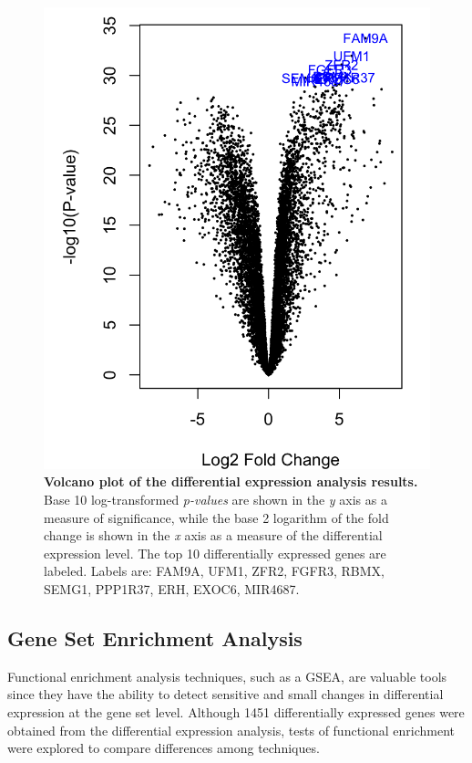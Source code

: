 \documentclass[9pt,twocolumn,twoside]{gsajnl}
\begin{document}
\begin{figure}[htbp]
\centering
\includegraphics[width=\linewidth-50, scale=0.75]{volcano}
\caption{\textbf{Volcano plot of the differential expression analysis results.} Base 10 log-transformed \textit{p-values} are shown in the \textit{y} axis as a measure of significance, while the base 2 logarithm of the fold change is shown in the \textit{x} axis as a measure of the differential expression level. The top 10 differentially expressed genes are labeled. Labels are: FAM9A, UFM1, ZFR2, FGFR3, RBMX, SEMG1, PPP1R37, ERH, EXOC6, MIR4687.}
\label{fig:de-volcano}
\end{figure}

\subsection{Gene Set Enrichment Analysis}

Functional enrichment analysis techniques, such as a GSEA, are valuable tools since they have the ability to detect sensitive and small changes in differential expression at the gene set level. Although 1451 differentially expressed genes were obtained from the differential expression analysis, tests of functional enrichment were explored to compare differences among techniques.
\end{document}
